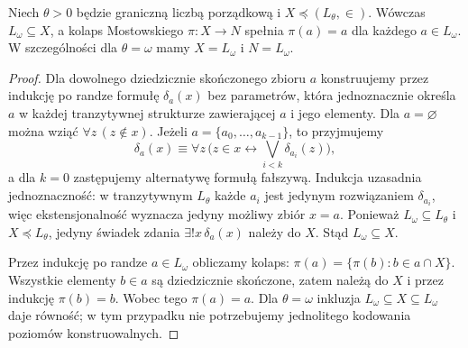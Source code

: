 \begin{lemat}
\label{lem:l-hf-fixed-collapse-76}
Niech $\theta>0$ będzie graniczną liczbą porządkową
i $X\preccurlyeq(L_\theta,\in)$.
Wówczas $L_\omega\subseteq X$, a kolaps Mostowskiego
$\pi:X\to N$ spełnia $\pi(a)=a$ dla każdego
$a\in L_\omega$. W szczególności dla $\theta=\omega$
mamy $X=L_\omega$ i $N=L_\omega$.
\end{lemat}
\begin{proof}
Dla dowolnego dziedzicznie skończonego zbioru $a$
konstruujemy przez indukcję po randze formułę
$\delta_a(x)$ bez parametrów, która jednoznacznie
określa $a$ w każdej tranzytywnej strukturze
zawierającej $a$ i jego elementy. Dla $a=\varnothing$
można wziąć $\forall z\,(z\notin x)$.
Jeżeli $a=\{a_0,\ldots,a_{k-1}\}$, to przyjmujemy
\[
\delta_a(x)\equiv\forall z\,
 \bigl(z\in x\longleftrightarrow
  \bigvee_{i<k}\delta_{a_i}(z)\bigr),
\]
a dla $k=0$ zastępujemy alternatywę formułą
fałszywą. Indukcja uzasadnia jednoznaczność:
w tranzytywnym $L_\theta$ każde $a_i$ jest
jedynym rozwiązaniem $\delta_{a_i}$, więc
ekstensjonalność wyznacza jedyny możliwy zbiór $x=a$.
Ponieważ $L_\omega\subseteq L_\theta$ i
$X\preccurlyeq L_\theta$, jedyny świadek zdania
$\exists!x\,\delta_a(x)$ należy do $X$.
Stąd $L_\omega\subseteq X$.

Przez indukcję po randze $a\in L_\omega$
obliczamy kolaps:
$\pi(a)=\{\pi(b):b\in a\cap X\}$.
Wszystkie elementy $b\in a$ są dziedzicznie
skończone, zatem należą do $X$ i przez indukcję
$\pi(b)=b$. Wobec tego $\pi(a)=a$.
Dla $\theta=\omega$ inkluzja
$L_\omega\subseteq X\subseteq L_\omega$
daje równość; w tym przypadku nie potrzebujemy
jednolitego kodowania poziomów konstruowalnych.
\end{proof}

